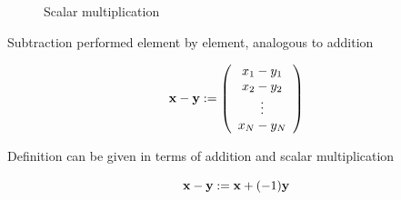\begin{frame}
    
\begin{figure}
  \begin{center}
    \caption{\label{f:vec_scalar} Scalar multiplication}
 \end{center}
\end{figure}

\end{frame}



\begin{frame}
    
    \vspace{2em}
    Subtraction performed element by element, analogous to addition 

    \begin{equation*}
        {\mathbf x} - {\mathbf y} 
        :=
        \left(
        \begin{array}{c}
            x_1 - y_1 \\
            x_2 - y_2 \\
            \vdots \\
            x_N - y_N
        \end{array}
        \right)
    \end{equation*}
    
    \vspace{.7em}
    Definition can be given in terms of addition and scalar multiplication

    \begin{equation*}
      {\mathbf x} - {\mathbf y} := {\mathbf x} + (-1) {\mathbf y}      
    \end{equation*}

\end{frame}



